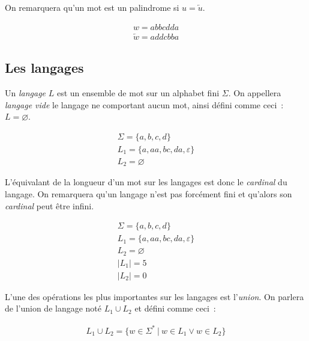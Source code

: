 \noindent On remarquera qu'un mot est un palindrome si \(u = \overleftarrow{u}\).

\begin{example}
    \begin{gather}
        w = abbcdda \\
        \overleftarrow{w} = addcbba
    \end{gather}
\end{example}

\subsection{Les langages}

Un \textit{langage} \(L\) est un ensemble de mot sur un alphabet fini
\(\Sigma\). On appellera \textit{langage vide} le langage ne comportant aucun
mot, ainsi défini comme ceci~: \(L = \varnothing\).

\begin{example}
    \begin{gather}
        \Sigma = \{a, b, c, d\} \\
        L_1 = \{a, aa, bc, da, \varepsilon\} \\
        L_2 = \varnothing
    \end{gather}
\end{example}

L'équivalant de la longueur d'un mot sur les langages est donc le
\textit{cardinal} du langage. On remarquera qu'un langage n'est pas forcément
fini et qu'alors son \textit{cardinal} peut être infini.

\begin{example}
    \begin{gather}
        \Sigma = \{a, b, c, d\} \\
        L_1 = \{a, aa, bc, da, \varepsilon\} \\
        L_2 = \varnothing \\
        | L_1 | = 5 \\
        | L_2 | = 0
    \end{gather}
\end{example}

L'une des opérations les plus importantes sur les langages est
l'\textit{union}. On parlera de l'union de langage noté \(L_1 \cup L_2\) et
défini comme ceci~:

\begin{gather}
    L_1 \cup L_2 = \{w \in \Sigma ^ * ~|~ w \in L_1 \lor w \in L_2\}
\end{gather}

